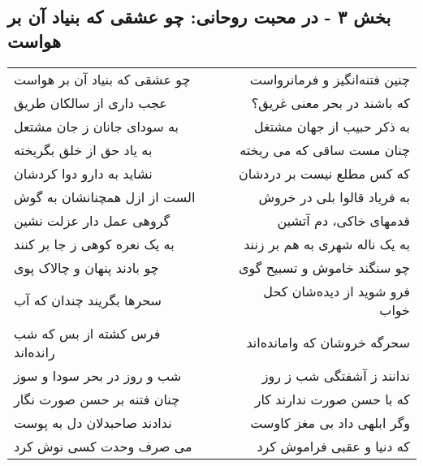 \begin{center}
\section*{بخش ۳ - در محبت روحانی: چو عشقی که بنیاد آن بر هواست}
\label{sec:003}
\begin{longtable}{l p{0.5cm} r}
چو عشقی که بنیاد آن بر هواست
&&
چنین فتنه‌انگیز و فرمانرواست
\\
عجب داری از سالکان طریق
&&
که باشند در بحر معنی غریق؟
\\
به سودای جانان ز جان مشتعل
&&
به ذکر حبیب از جهان مشتغل
\\
به یاد حق از خلق بگریخته
&&
چنان مست ساقی که می ریخته
\\
نشاید به دارو دوا کردشان
&&
که کس مطلع نیست بر دردشان
\\
الست از ازل همچنانشان به گوش
&&
به فریاد قالوا بلی در خروش
\\
گروهی عمل دار عزلت نشین
&&
قدمهای خاکی، دم آتشین
\\
به یک نعره کوهی ز جا بر کنند
&&
به یک ناله شهری به هم بر زنند
\\
چو بادند پنهان و چالاک پوی
&&
چو سنگند خاموش و تسبیح گوی
\\
سحرها بگریند چندان که آب
&&
فرو شوید از دیده‌شان کحل خواب
\\
فرس کشته از بس که شب رانده‌اند
&&
سحرگه خروشان که وامانده‌اند
\\
شب و روز در بحر سودا و سوز
&&
ندانند ز آشفتگی شب ز روز
\\
چنان فتنه بر حسن صورت نگار
&&
که با حسن صورت ندارند کار
\\
ندادند صاحبدلان دل به پوست
&&
وگر ابلهی داد بی مغز کاوست
\\
می صرف وحدت کسی نوش کرد
&&
که دنیا و عقبی فراموش کرد
\\
\end{longtable}
\end{center}
